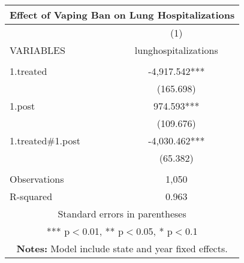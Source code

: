 \documentclass[]{article}
\begin{document}
\begin{tabular}{lc}
\multicolumn{2}{c}{\textbf{Effect of Vaping Ban on Lung Hospitalizations}} \\ \hline
 & (1) \\
VARIABLES & lunghospitalizations \\ \hline
 &  \\
1.treated & -4,917.542*** \\
 & (165.698) \\
1.post & 974.593*** \\
 & (109.676) \\
1.treated\#1.post & -4,030.462*** \\
 & (65.382) \\
 &  \\
Observations & 1,050 \\
 R-squared & 0.963 \\ \hline
\multicolumn{2}{c}{ Standard errors in parentheses} \\
\multicolumn{2}{c}{ *** p$<$0.01, ** p$<$0.05, * p$<$0.1} \\
\multicolumn{2}{c}{ \textbf{Notes:} Model include state and year fixed effects.} \\
\end{tabular}
\end{document}
